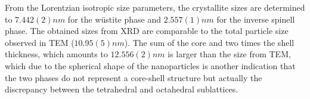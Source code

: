 \documentclass[\main/dresen_thesis.tex]{subfiles}
\begin{document}
    From the Lorentzian isotropic size parameters, the crystallite sizes are determined to $7.442(2) \unit{nm}$ for the w\"ustite phase and $2.557(1) \unit{nm}$ for the inverse spinell phase.
    The obtained sizes from XRD are comparable to the total particle size observed in TEM ($10.95(5) \unit{nm}$).
    The sum of the core and two times the shell thickness, which amounts to $12.556(2) \unit{nm}$ is larger than the size from TEM, which due to the spherical shape of the nanoparticles is another indication that the two phases do not represent a core-shell structure but actually the discrepancy between the tetrahedral and octahedral sublattices.


\end{document}
